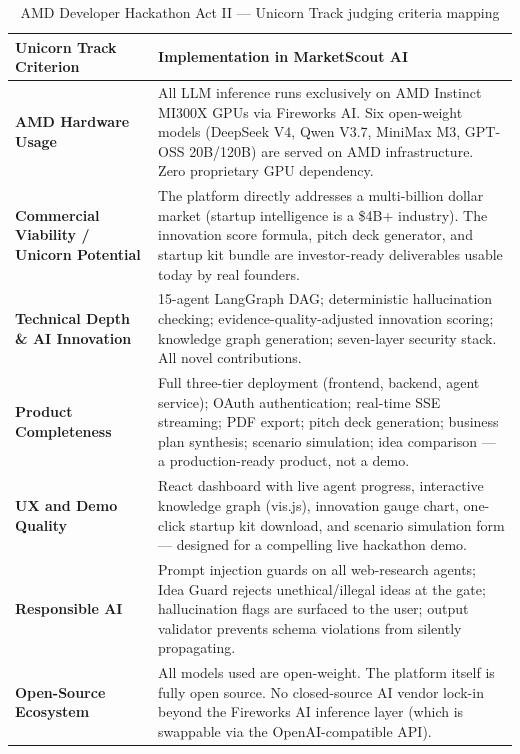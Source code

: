\documentclass[12pt,a4paper,oneside]{book}
\begin{document}
\begin{table}[H]
\centering
\caption{AMD Developer Hackathon Act II — Unicorn Track judging criteria mapping}
\label{tab:hackathon}
\begin{tabularx}{\textwidth}{lX}
\toprule
\textbf{Unicorn Track Criterion} & \textbf{Implementation in MarketScout AI} \\
\midrule
\textbf{AMD Hardware Usage} &
  All LLM inference runs exclusively on AMD Instinct MI300X GPUs via
  Fireworks AI. Six open-weight models (DeepSeek V4, Qwen V3.7, MiniMax M3,
  GPT-OSS 20B/120B) are served on AMD infrastructure. Zero proprietary GPU
  dependency. \\[4pt]
\textbf{Commercial Viability / Unicorn Potential} &
  The platform directly addresses a multi-billion dollar market (startup
  intelligence is a \$4B+ industry). The innovation score formula, pitch deck
  generator, and startup kit bundle are investor-ready deliverables usable
  today by real founders. \\[4pt]
\textbf{Technical Depth \& AI Innovation} &
  15-agent LangGraph DAG; deterministic hallucination checking;
  evidence-quality-adjusted innovation scoring; knowledge graph generation;
  seven-layer security stack. All novel contributions. \\[4pt]
\textbf{Product Completeness} &
  Full three-tier deployment (frontend, backend, agent service); OAuth
  authentication; real-time SSE streaming; PDF export; pitch deck generation;
  business plan synthesis; scenario simulation; idea comparison — a
  production-ready product, not a demo. \\[4pt]
\textbf{UX and Demo Quality} &
  React dashboard with live agent progress, interactive knowledge graph
  (vis.js), innovation gauge chart, one-click startup kit download, and
  scenario simulation form — designed for a compelling live hackathon demo. \\[4pt]
\textbf{Responsible AI} &
  Prompt injection guards on all web-research agents; Idea Guard rejects
  unethical/illegal ideas at the gate; hallucination flags are surfaced to the
  user; output validator prevents schema violations from silently propagating. \\[4pt]
\textbf{Open-Source Ecosystem} &
  All models used are open-weight. The platform itself is fully open source.
  No closed-source AI vendor lock-in beyond the Fireworks AI inference layer
  (which is swappable via the OpenAI-compatible API). \\
\bottomrule
\end{tabularx}
\end{table}
\end{document}

